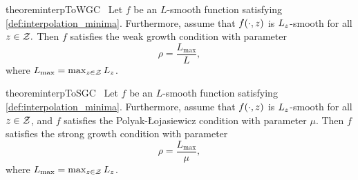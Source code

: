 \begin{restatable}{theorem}{interpToWGC}~\label{thm:interp_to_wgc}
    Let \( f \) be an \( L \)-smooth function satisfying \autoref{def:interpolation_minima}.
    Furthermore, assume that \( f(\cdot, z) \) is \( L_z \)-smooth for all \( z \in \mathcal{Z}. \)
    Then \( f \) satisfies the weak growth condition with parameter
    \[ \rho = \frac{L_{\text{max}}}{L}, \]
    where \( L_{\text{max}} = \max_{z \in \mathcal{Z}} L_z \).
\end{restatable}


\begin{restatable}{theorem}{interpToSGC}~\label{thm:interp_to_sgc}
    Let \( f \) be an \( L \)-smooth function satisfying \autoref{def:interpolation_minima}.
    Furthermore, assume that \( f(\cdot, z) \) is \( L_z \)-smooth for all \( z \in \mathcal{Z} \),
    and \( f \) satisfies the Polyak-Łojasiewicz condition with parameter \( \mu \).
    Then \( f \) satisfies the strong growth condition with parameter
    \[ \rho = \frac{L_{\text{max}}}{\mu}, \]
    where \( L_{\text{max}} = \max_{z \in \mathcal{Z}} L_z \).
\end{restatable}
